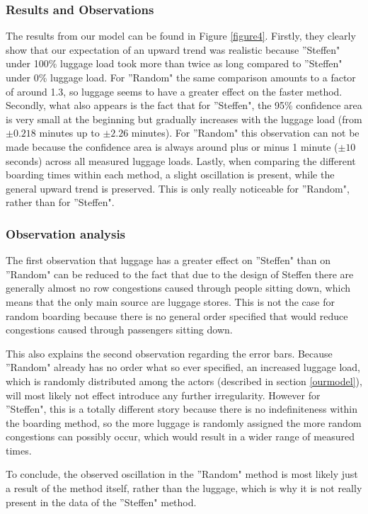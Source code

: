 \documentclass[11pt]{article}
\begin{document}
	\subsubsection{Results and Observations}
	The results from our model can be found in Figure \ref{figure4}. Firstly, they clearly show that our expectation of an upward trend was realistic because ''Steffen" under 100\% luggage load took more than twice as long compared to ''Steffen" under 0\% luggage load. For ''Random" the same comparison amounts to a factor of around 1.3, so luggage seems to have a greater effect on the faster method. Secondly, what also appears is the fact that for ''Steffen", the 95\% confidence area is very small at the beginning but gradually increases with the luggage load (from $\pm 0.218$ minutes up to $\pm 2.26$ minutes). For ''Random" this observation can not be made because the confidence area is always around plus or minus 1 minute ($\pm 10$ seconds) across all measured luggage loads. Lastly, when comparing the different boarding times within each method, a slight oscillation is present, while the general upward trend is preserved. This is only really noticeable for ''Random", rather than for ''Steffen". 
	
	\subsubsection{Observation analysis}
		The first observation that luggage has a greater effect on ''Steffen" than on ''Random" can be reduced to the fact that due to the design of Steffen there are generally almost no row congestions caused through people sitting down, which means that the only main source are luggage stores. This is not the case for random boarding because there is no general order specified that would reduce congestions caused through passengers sitting down. 
		
		This also explains the second observation regarding the error bars. Because ''Random" already has no order what so ever specified, an increased luggage load, which is randomly distributed among the actors (described in section \ref{ourmodel}), will most likely not effect introduce any further irregularity. However for ''Steffen", this is a totally different story because there is no indefiniteness within the boarding method, so the more luggage is randomly assigned the more random congestions can possibly occur, which would result in a wider range of measured times.
		
		To conclude, the observed oscillation in the ''Random" method is most likely just a result of the method itself, rather than the luggage, which is why it is not really present in the data of the ''Steffen" method.
	
\end{document}
